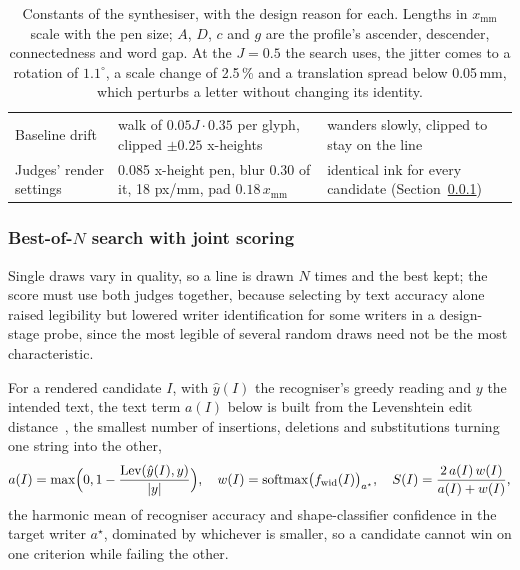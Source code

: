 \begin{table}[!htbp]
\begin{tabularx}{\linewidth}{|p{3.5cm}|p{3.2cm}|X|}
Baseline drift & walk of $0.05J\cdot0.35$ per glyph, clipped $\pm0.25$ x-heights & wanders slowly, clipped to stay on the line \\
Judges' render settings & 0.085 x-height pen, blur 0.30 of it, 18 px/mm, pad $0.18\,x_{\mathrm{mm}}$ & identical ink for every candidate (Section~\ref{sec:syn-search}) \\
\hline
\end{tabularx}
\caption{Constants of the synthesiser, with the design reason for each. Lengths in $x_{\mathrm{mm}}$ scale with the pen size; $A$, $D$, $c$ and $g$ are the profile's ascender, descender, connectedness and word gap. At the $J=0.5$ the search uses, the jitter comes to a rotation of $1.1^\circ$, a scale change of 2.5\,\% and a translation spread below 0.05\,mm, which perturbs a letter without changing its identity.}
\label{tab:syn-const}
\end{table}

\subsubsection{Best-of-$N$ search with joint scoring}
\label{sec:syn-search}

Single draws vary in quality, so a line is drawn $N$ times and the best kept; the score must use both judges together, because selecting by text accuracy alone raised legibility but lowered writer identification for some writers in a design-stage probe, since the most legible of several random draws need not be the most characteristic.

For a rendered candidate $I$, with $\hat y(I)$ the recogniser's greedy reading and $y$ the intended text, the text term $a(I)$ below is built from the Levenshtein edit distance~\cite[pp.~707--708]{levenshtein1966}, the smallest number of insertions, deletions and substitutions turning one string into the other,
\begin{equation}
a(I)=\max\Bigl(0,1-\frac{\mathrm{Lev}(\hat y(I),y)}{|y|}\Bigr),\quad w(I)=\mathrm{softmax}\bigl(f_{\mathrm{wid}}(I)\bigr)_{a^\star},\quad S(I)=\frac{2\,a(I)\,w(I)}{a(I)+w(I)},
\label{eq:syn-score}
\end{equation}
the harmonic mean of recogniser accuracy and shape-classifier confidence in the target writer $a^\star$, dominated by whichever is smaller, so a candidate cannot win on one criterion while failing the other.

